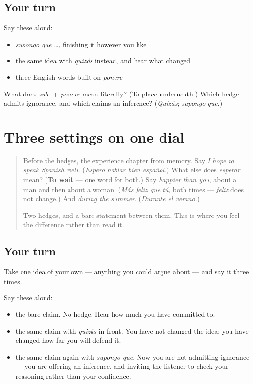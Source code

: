 \subsection*{Your turn}
Say these aloud:

\begin{itemize}
\raggedright
  \item \emph{supongo que} …, finishing it however you like
  \item the same idea with \emph{quizás} instead, and hear what changed
  \item three English words built on \emph{ponere}
\end{itemize}

\begin{tcolorbox}[breakable,colback=teal!4,colframe=teal!35!black,title={Before you move on}]
What does \emph{sub-} + \emph{ponere} mean literally? (To place underneath.) Which hedge admits ignorance, and which claims an inference? (\emph{Quizás}; \emph{supongo que}.)
\end{tcolorbox}
\section[Practice]{Three settings on one dial}

\label{lesson:ES-C271-practice}



\begin{quote}
Before the hedges, the experience chapter from memory. Say \emph{I hope to speak Spanish well}. (\emph{Espero hablar bien español}.) What else does \emph{esperar} mean? (\textbf{To wait} — one word for both.) Say \emph{happier than you}, about a man and then about a woman. (\emph{Más feliz que tú}, both times — \emph{feliz} does not change.) And \emph{during the summer}. (\emph{Durante el verano}.)

Two hedges, and a bare statement between them. This is where you feel the difference rather than read it.
\end{quote}

\subsection*{Your turn}
Take one idea of your own — anything you could argue about — and say it three times.

Say these aloud:

\begin{itemize}
\raggedright
  \item the bare claim. No hedge. Hear how much you have committed to.
  \item the same claim with \emph{quizás} in front. You have not changed the idea; you have changed how far you will defend it.
  \item the same claim again with \emph{supongo que}. Now you are not admitting ignorance — you are offering an inference, and inviting the listener to check your reasoning rather than your confidence.
\end{itemize}

